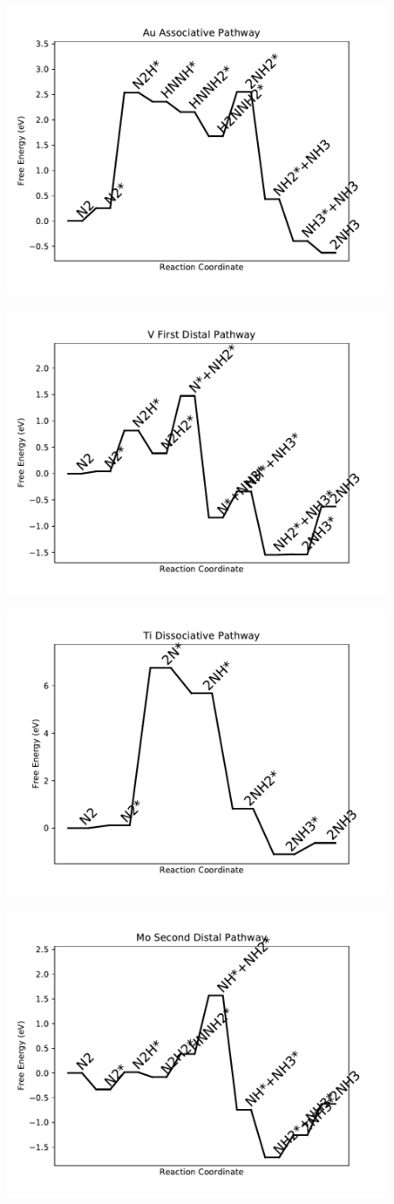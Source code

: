 \documentclass[journal=jacsat,manuscript=article]{achemso}
\begin{document}
\begin{figure}
\includegraphics[width=0.5\linewidth]{data/plots/Au_associative.pdf}
\label{fig:Au_associative}
\end{figure}

\newpage
\begin{figure}
\includegraphics[width=0.5\linewidth]{data/plots/V_distal_1.pdf}
\label{fig:V_distal_1}
\end{figure}

\begin{figure}
\includegraphics[width=0.5\linewidth]{data/plots/Ti_dissociative.pdf}
\label{fig:Ti_dissociative}
\end{figure}

\newpage
\begin{figure}
\includegraphics[width=0.5\linewidth]{data/plots/Mo_distal_2.pdf}
\label{fig:Mo_distal_2}
\end{figure}
\end{document}
